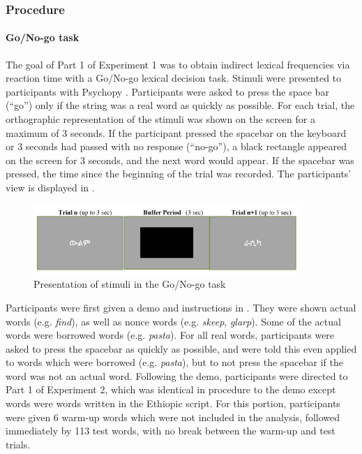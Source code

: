 \documentclass[output=paper
,newtxmath
,modfonts
,nonflat]{langsci/langscibook}
\begin{document}
\subsubsection{Procedure}\label{sec:moeng:6.1.2}
\paragraph{Go/No-go task}

The goal of Part 1 of Experiment 1 was to obtain indirect lexical frequencies via reaction time with a Go/No-go lexical decision task. Stimuli were presented to participants with Psychopy \citep{peirce2007psychopy}. Participants were asked to press the space bar (“go”) only if the string was a real word as quickly as possible. For each trial, the orthographic representation of the stimuli was shown on the screen for a maximum of 3 seconds. If the participant pressed the spacebar on the keyboard or 3 seconds had passed with no response (“no-go”), a black rectangle appeared on the screen for 3 seconds, and the next word would appear. If the spacebar was pressed, the time since the beginning of the trial was recorded. The participants’ view is displayed in .

   

\begin{figure}
\includegraphics[width=0.9\textwidth]{figures/fig-moeng-4}
\caption{Presentation of stimuli in the Go/No-go task}
\label{fig:moeng:5}
\end{figure}

Participants were first given a demo and instructions in . They were shown actual  words (e.g. \textit{find}), as well as nonce words (e.g. \textit{skeep}, \textit{glarp}). Some of the actual words were borrowed words (e.g. \textit{pasta}). For all real words, participants were asked to press the spacebar as quickly as possible, and were told this even applied to words which were borrowed (e.g. \textit{pasta}), but to not press the spacebar if the word was not an actual  word. Following the  demo, participants were directed to Part 1 of Experiment 2, which was identical in procedure to the  demo except words were  words written in the Ethiopic script. For this portion, participants were given 6 warm-up words which were not included in the analysis, followed immediately by 113 test words, with no break between the warm-up and test trials.
\end{document}
